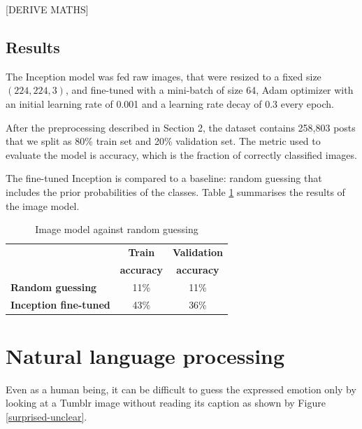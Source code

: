 \documentclass{article} %
\begin{document}
[DERIVE MATHS]

\subsection{Results}
The Inception model was fed raw images, that were resized to a fixed size $(224, 224, 3)$, and fine-tuned with a mini-batch of size 64, Adam optimizer with an initial learning rate of 0.001 and a learning rate decay of 0.3 every epoch.

After the preprocessing described in Section 2, the dataset contains 258,803 posts that we split as 80\% train set and 20\% validation set. The metric used to evaluate the model is accuracy, which is the fraction of correctly classified images.

The fine-tuned Inception is compared to a baseline: random guessing that includes the prior probabilities of the classes. Table \ref{image-results} summarises the results of the image model.

\begin{table}[H]
\caption{Image model against random guessing}
\begin{center}
    \begin{tabular}{ l | c | c}
    & \textbf{Train} & \textbf{Validation} \\
    & \textbf{accuracy} & \textbf{accuracy} \\ \hline
    \textbf{Random guessing} & 11\% & 11\% \\ \hline
    \textbf{Inception fine-tuned}  & 43\% & 36\% \\
    \end{tabular}
\end{center}
\label{image-results}
\end{table}

\section{Natural language processing}
Even as a human being, it can be difficult to guess the expressed emotion only by looking at a Tumblr image without reading its caption as shown by Figure \ref{surprised-unclear}.
\end{document}
